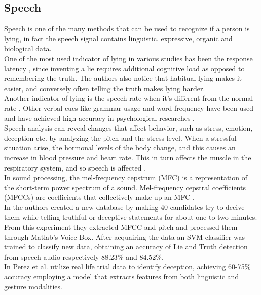 \subsection*{Speech}
Speech is one of the many methods that can be used to recognize if a person is lying, in fact the speech signal contains linguistic, expressive, organic and biological data. \cite{norena}\\
One of the most used indicator of lying in various studies has been the response latency \cite{EaseLying}, since inventing a lie requires additional cognitive load as opposed to remembering the truth. The authors also notice that habitual lying makes it easier, and conversely often telling the truth makes lying harder.\\
Another indicator of lying is the speech rate when it's different from the normal rate \cite{TemporalCues}. Other verbal cues like grammar usage and word frequency have been used and have achieved high accuracy in psychological researches \cite{PorterTruthLying}.\\
Speech analysis can reveal changes that affect behavior, such as stress, emotion, deception etc. by analyzing the pitch and the stress level. When a stressful situation arise, the hormonal levels of the body change, and this causes an increase in blood pressure and heart rate. This in turn affects the muscle in the respiratory system, and so speech is affected \cite{norena}. \\
In sound processing, the mel-frequency cepstrum (MFC) is a representation of the short-term power spectrum of a sound. Mel-frequency cepstral coefficients (MFCCs) are coefficients that collectively make up an MFC \cite{wiki:mfcc}. \\
In \cite{relidss} the authors created a new database by making 40 candidates try to decive them while telling truthful or deceptive statements for about one to two minutes. From this experiment they extracted MFCC and pitch and processed them through Matlab's Voice Box. After acquairing the data an SVM classifier was trained to classify new data, obtaining an accuracy of Lie and Truth detection from speech audio respectively 88.23\% and 84.52\%. \\
In \cite{Perez-Rosas:2015:DDU:2818346.2820758} \cite{Mihalcea:2013:ADD:2522848.2522888} Perez et al. utilize real life trial data to identify deception, achieving 60-75\% accuracy employing a model that extracts features from both linguistic and gesture modalities.
 
